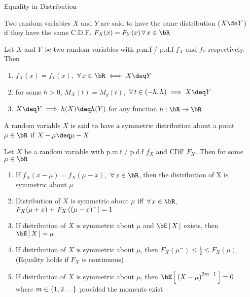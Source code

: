 \documentclass{article}
\begin{document}
\makeheader%

\begin{ssection}{Equality in Distribution}

	\begin{definition}
		Two random variables $X$ and $Y$ are said to have the same distribution ($X \de Y$) if they have the same C.D.F.  $F_X(x) = F_Y(x) \qforall x \in \bR$
	\end{definition}

	\begin{result}
		Let $X$ and $Y$ be two random variables with p.m.f / p.d.f $f_X$ and $f_Y$ respectively. Then

		\begin{enumerate}[label=(\roman*)]
			\item $f_X(x) = f_Y(x)$, $\qforall x \in \bR \iff X \deq Y$
			\item for some $h > 0$, $M_X(t) = M_y(t)$, $\qforall t \in (-h, h) \implies X \deq Y$
			\item $X \deq Y \implies h(X) \deq h(Y)$ for any function $h : \bR \ra \bR$
		\end{enumerate}
	\end{result}

	\begin{definition}
		A random variable $X$ is said to have a symmetric distribution about a point $\mu \in \bR$ if $X - \mu \deq \mu - X$
	\end{definition}

	\begin{result}
		Let $X$ be a random variable with p.m.f / p.d.f $f_X$ and CDF $F_X$. Then for some $\mu \in \bR$

		\begin{enumerate}[label=(\roman*)]
			\item If $f_X(x - \mu) = f_X(\mu - x)$, $\qforall x \in \bR$, then the distribution of X is symmetric about $\mu$
			\item Distribution of $X$ is symmetric about $\mu$ iff $\qforall x \in \bR$, $F_X(\mu + x) + \func{F_X}{(\mu - x)^-} = 1$
			\item If distribution of $X$ is symmetric about $\mu$ and $\E{X}$ exists, then $\E{X} = \mu$
			\item If distribution of $X$ is symmetric about $\mu$, then $F_X(\mu^-) \le \frac{1}{2} \le F_X(\mu)$ (Equality holds if $F_X$ is continuous)
			\item If distribution of $X$ is symmetric about $\mu$, then $\E{\para{X - \mu}^{2m - 1}} = 0$ where $m \in \left\{ {1, 2 \dots} \right\}$ provided the moments exist
		\end{enumerate}
	\end{result}

\end{ssection}
\end{document}
